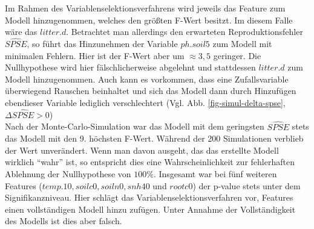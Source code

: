 Im Rahmen des Variablenselektionsverfahrens wird jeweils das Feature zum Modell hinzugenommen, welches den größten F-Wert besitzt.
Im diesem Falle wäre das $litter.d$.
Betrachtet man allerdings den erwarteten Reproduktionsfehler $\widehat{SPSE}$, so führt das Hinzunehmen der Variable $ph.soil5$ zum Modell mit minimalen Fehlern.
Hier ist der F-Wert aber um $\approx 3,5$ geringer.
Die Nullhypothese wird hier fälschlicherweise abgelehnt und stattdessen $litter.d$ zum Modell hinzugenommen.
Auch kann es vorkommen, dass eine Zufallsvariable überwiegend Rauschen beinhaltet und sich das Modell dann durch Hinzufügen ebendieser Variable lediglich verschlechtert (Vgl. Abb. \ref{fig-simul-delta-spse}, $\Delta \widehat{SPSE} > 0$)
\\
Nach der Monte-Carlo-Simulation war das Modell mit dem geringsten $\widehat{SPSE}$ stets das Modell mit den 9. höchsten F-Wert.
Während der 200 Simulationen verblieb der Wert unverändert.
Wenn man davon ausgeht, das das erstellte Modell wirklich "`wahr"' ist, so entspricht dies eine Wahrscheinlichkeit zur fehlerhaften Ablehnung der Nullhypothese von $100\%$.
Insgesamt war bei fünf weiteren Features ($temp.10, soilc0, soiln0, snh40$ und $ rootc0$) der p-value stets unter dem Signifikanzniveau.
Hier schlägt das Variablenselektionsverfahren vor, Features einen vollständigen Modell hinzu zufügen.
Unter Annahme der Vollständigkeit des Modells ist dies aber falsch.

